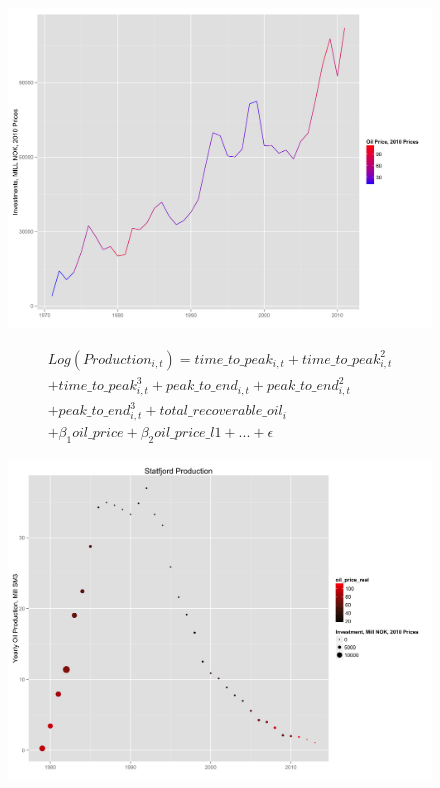 \documentclass{beamer}
\begin{document}

\begin{frame}[plain]
	\begin{figure}
	\includegraphics[width=1\textwidth]{invest_with_oil_price.png}
	\end{figure}
\end{frame}

\begin{frame}[plain]
	\begin{multline}
	\nonumber Log(Production_{i,t})=time\_to\_peak_{i,t} + time\_to\_peak_{i,t}^2 \\
	 + time\_to\_peak_{i,t}^3  + peak\_to\_end_{i,t} + peak\_to\_end_{i,t}^2 \\
	 + peak\_to\_end_{i,t}^3 + total\_recoverable\_oil_i \\
	 + \beta_1 oil\_price + \beta_2 oil\_price\_l1 + ...+ \epsilon
	\end{multline}
\end{frame}

\begin{frame}[plain]
	\begin{figure}
	\includegraphics[width=1\textwidth]{statfjord_plot.png}
	\end{figure}
\end{frame}
\end{document}
